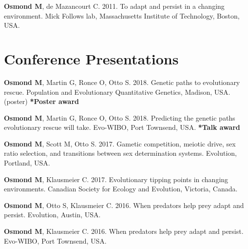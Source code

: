 \documentclass[12pt]{article}
\begin{document}

\textbf{Osmond M}, de Mazancourt C. 2011. To adapt and persist in a changing environment. Mick Follows lab, Massachusetts Institute of Technology, Boston, USA.

\newpage
\section*{Conference Presentations}

\textbf{Osmond M}, Martin G, Ronce O, Otto S. 2018. Genetic paths to evolutionary rescue. Population and Evolutionary Quantitative Genetics, Madison, USA. (poster) \textbf{*Poster award}


\textbf{Osmond M}, Martin G, Ronce O, Otto S. 2018. Predicting the genetic paths evolutionary rescue will take. Evo-WIBO, Port Townsend, USA. \textbf{*Talk award}


\textbf{Osmond M}, Scott M, Otto S. 2017. Gametic competition, meiotic drive, sex ratio selection, and transitions between sex determination systems. Evolution, Portland, USA. 

\textbf{Osmond M}, Klausmeier C. 2017. Evolutionary tipping points in changing environments. Canadian Society for Ecology and Evolution, Victoria, Canada. 


\textbf{Osmond M}, Otto S, Klausmeier C. 2016. When predators help prey adapt and persist. Evolution, Austin, USA. 

\textbf{Osmond M}, Klausmeier C. 2016. When predators help prey adapt and persist. Evo-WIBO, Port Townsend, USA.
\end{document}
